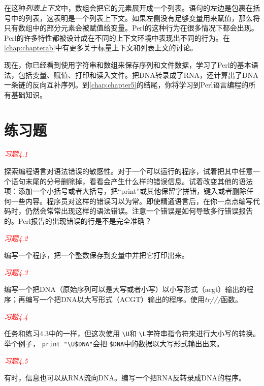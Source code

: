 在这种\textit{列表上下文}中，数组会把它的元素展开成一个列表。语句的左边是包裹在括号中的列表，这表明是一个列表上下文。如果左侧没有足够变量用来赋值，那么将只有数组中的部分元素会被赋值给变量。Perl的这种行为在很多情况下都会出现。Perl的许多特性都被设计成在不同的上下文环境中表现出不同的行为。在\autoref{chap:chapterab}中有更多关于标量上下文和列表上文的讨论。

现在，你已经看到使用字符串和数组来保存序列和文件数据，学习了Perl的基本语法，包括变量、赋值、打印和读入文件。把DNA转录成了RNA，还计算出了DNA一条链的反向互补序列。到\autoref{chap:chapter5}的结尾，你将学习到Perl语言编程的所有基础知识。

\section{练习题}
\textcolor{red}{\textit{习题4.1}}
\begin{adjustwidth}{4em}{}
探索编程语言对语法错误的敏感性。对于一个可以运行的程序，试着把其中任意一个语句末尾的分号删除掉，看看会产生什么样的错误信息。试着改变其他的语法项：添加一个小括号或者大括号，把“print”或其他保留字拼错，键入或者删除任何一些内容。程序员对这样的错误习以为常。即使精通语言后，在你一点点编写代码时，仍然会常常出现这样的语法错误。注意一个错误是如何导致多行错误报告的。Perl报告的出现错误的行是不是完全准确？
\end{adjustwidth}

\textcolor{red}{\textit{习题4.2}}
\begin{adjustwidth}{4em}{}
编写一个程序，把一个整数保存到变量中并把它打印出来。
\end{adjustwidth}

\textcolor{red}{\textit{习题4.3}}
\begin{adjustwidth}{4em}{}
编写一个把DNA（原始序列可以是大写或者小写）以小写形式（acgt）输出的程序；再编写一个把DNA以大写形式（ACGT）输出的程序。使用\textit{tr///}函数。
\end{adjustwidth}

\textcolor{red}{\textit{习题4.4}}
\begin{adjustwidth}{4em}{}
任务和练习4.3中的一样，但这次使用 \verb|\U|和 \verb|\L|字符串指令符来进行大小写的转换。举个例子， \verb|print "\U$DNA"|会把 \verb|$DNA|中的数据以大写形式输出出来。
\end{adjustwidth}

\textcolor{red}{\textit{习题4.5}}
\begin{adjustwidth}{4em}{}
有时，信息也可以从RNA流向DNA。编写一个把RNA反转录成DNA的程序。
\end{adjustwidth}

